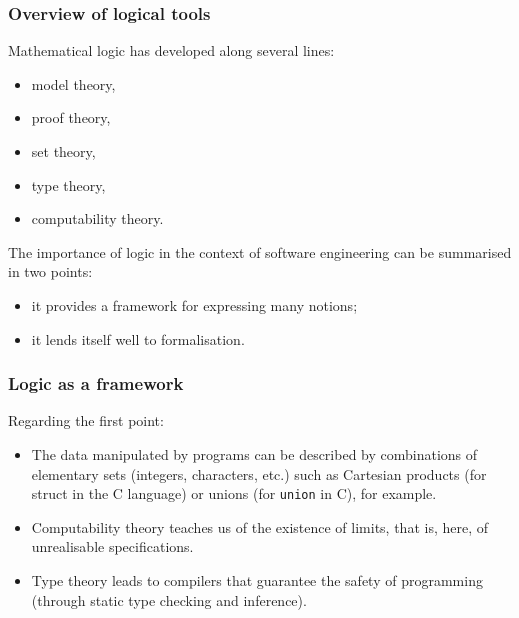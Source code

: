 \documentclass[compress,dvipdfmx]{beamer}
\begin{document}
%
\begin{frame}
\frametitle{Overview of logical tools}

Mathematical logic has developed along several lines:
\begin{itemize}

  \item model theory,

  \item proof theory,

  \item set theory,

  \item type theory,

  \item computability theory.

\end{itemize}
The importance of logic in the context of software engineering can
be summarised in two points:
\begin{itemize}

  \item it provides a framework for expressing many notions;

  \item it lends itself well to formalisation.

\end{itemize}

\end{frame}

%
\begin{frame}
\frametitle{Logic as a framework}

Regarding the first point:
\begin{itemize}

  \item The data manipulated by programs can be described by
    combinations of elementary sets (integers, characters, etc.) such
    as Cartesian products (for \texttt\small {struct} in the
    \textsf{C} language) or unions (for \texttt{\small union} in
    \textsf{C}), for example.

  \item Computability theory teaches us of the existence of limits,
  that is, here, of unrealisable specifications.

  \item Type theory leads to compilers that guarantee the safety of
  programming (through static type checking and inference).

\end{itemize}

\end{frame}
\end{document}
